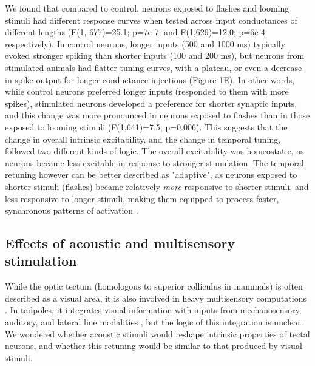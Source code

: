 \documentclass{article}
\begin{document}
We found that compared to control, neurons exposed to flashes and looming stimuli had different response curves when tested across input conductances of different lengths (F(1, 677)=25.1; p=7e-7; and F(1,629)=12.0; p=6e-4 respectively). In control neurons, longer inputs (500 and 1000 ms) typically evoked stronger spiking than shorter inputs (100 and 200 ms), but neurons from stimulated animals had flatter tuning curves, with a plateau, or even a decrease in spike output for longer conductance injections (Figure 1E). In other words, while control neurons preferred longer inputs (responded to them with more spikes), stimulated neurons developed a preference for shorter synaptic inputs, and this change was more pronounced in neurons exposed to flashes than in those exposed to looming stimuli (F(1,641)=7.5; p=0.006). This suggests that the change in overall intrinsic excitability, and the change in temporal tuning, followed two different kinds of logic. The overall excitability was homeostatic, as neurons became less excitable in response to stronger stimulation. The temporal retuning however can be better described as "adaptive", as neurons exposed to shorter stimuli (flashes) became relatively \textit{more} responsive to shorter stimuli, and less responsive to longer stimuli, making them equipped to process faster, synchronous patterns of activation \citep{stemmler1999information, fontaine2014threshold}.

\subsection*{Effects of acoustic and multisensory stimulation}

While the optic tectum (homologous to superior colliculus in mammals) is often described as a visual area, it is also involved in heavy multisensory computations \citep{stein2014}. In tadpoles, it integrates visual information with inputs from mechanosensory, auditory, and lateral line modalities \citep{deeg2009,pratt2009trigeminal,hiramoto2009,felch2016,truszkowski2017}, but the logic of this integration is unclear. We wondered whether acoustic stimuli would reshape intrinsic properties of tectal neurons, and whether this retuning would be similar to that produced by visual stimuli. 
\end{document}
